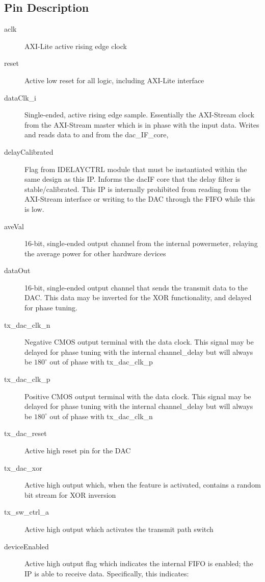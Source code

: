 \documentclass[11pt]{article}
\begin{document}
\subsection{Pin Description}
\begin{description}
	\item[aclk]AXI-Lite active rising edge clock
	\item[reset]Active low reset for all logic, including AXI-Lite interface
	\item[dataClk\_i]Single-ended, active rising edge sample. Essentially the AXI-Stream clock from the AXI-Stream master which is in phase with the
		input data. Writes and reads data to and from the dac\_IF\_core,
	\item[delayCalibrated]Flag from IDELAYCTRL module that must be instantiated within the same design as this IP. Informs the dac\textunderscore IF
		\textunderscore core that the delay filter is stable/calibrated. This IP is internally prohibited from reading from the AXI-Stream
		interface or writing to the DAC through the FIFO while this is low.
	\item[aveVal]16-bit, single-ended output channel from the internal power\textunderscore meter, relaying the average power for other hardware devices
	\item[dataOut]16-bit, single-ended output channel that sends the transmit data to the DAC. This data may be inverted for the XOR functionality, and
		delayed for phase tuning.
	\item[tx\_dac\_clk\_n]Negative CMOS output terminal with the data clock. This signal may be delayed for phase tuning with the internal channel\_delay
		but will always be $180^{\circ}$ out of phase with tx\_dac\_clk\_p
	\item[tx\_dac\_clk\_p]Positive CMOS output terminal with the data clock. This signal may be delayed for phase tuning with the internal channel\_delay
		but will always be $180^{\circ}$ out of  phase with tx\_dac\_clk\_n
	\item[tx\_dac\_reset]Active high reset pin for the DAC
	\item[tx\_dac\_xor]Active high output which, when the feature is activated, contains a random bit stream for XOR inversion
	\item[tx\_sw\_ctrl\_a]Active high output which activates the transmit path switch
	\item[deviceEnabled]Active high output flag which indicates the internal FIFO is enabled; the IP is able to receive data. Specifically, this
		indicates:
		\begin{enumerate}

\end{enumerate}
\end{description}
\end{document}

